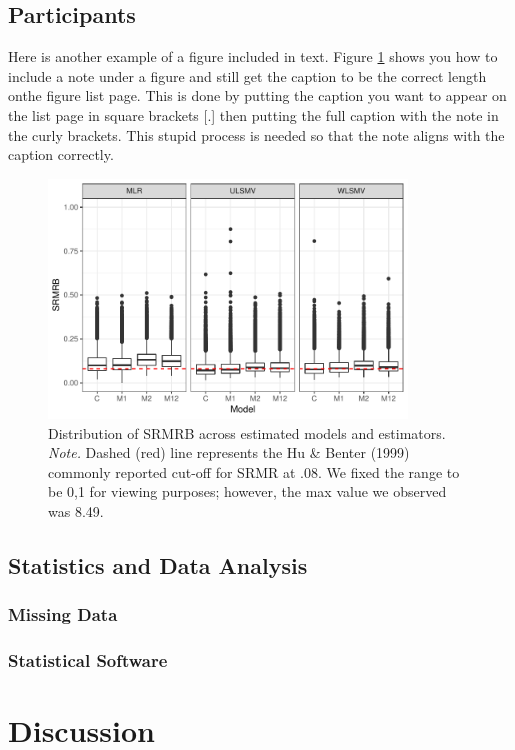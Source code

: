 \subsection{Participants}
\lipsum[1]


Here is another example of a figure included in text.
Figure \ref{fig:srmrb} shows you how to include a note under a figure and still get the caption to be the correct length onthe figure list page. 
This is done by putting the caption you want to appear on the list page in square brackets [.] then putting the full caption with the note in the curly brackets.
This stupid process is needed so that the note aligns with the caption correctly. 

\begin{figure}[!tbp]
\centering
\includegraphics[width=0.85\textwidth]{figure/srmrb_marginal_model_estimator}
\caption[Distribution of SRMRB across estimated models and estimators]{Distribution of SRMRB across estimated models and estimators.\\ \textit{Note.} Dashed (red) line represents the Hu \& Benter (1999) commonly reported cut-off for SRMR at .08. We fixed the range to be 0,1 for viewing purposes; however, the max value we observed was 8.49.} \label{fig:srmrb}
\end{figure}

\subsection{Statistics and Data Analysis}
\lipsum[1]
\subsubsection{Missing Data}
\lipsum[1]

\subsubsection{Statistical Software}
\lipsum[1]

\section{Discussion}
\lipsum[1]


